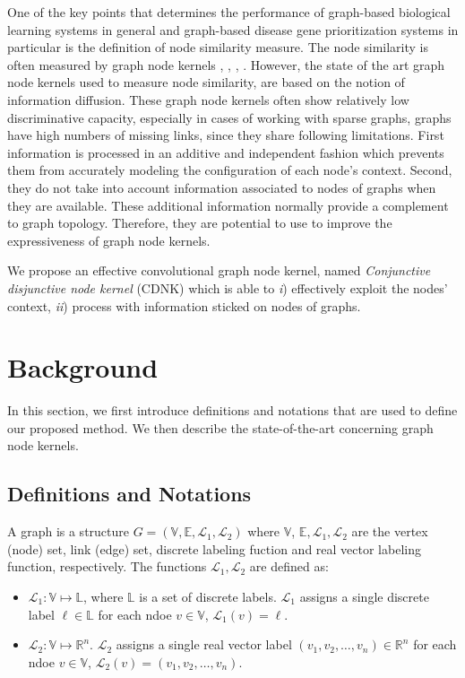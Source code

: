 \documentclass[review]{elsarticle}
\begin{document}
One of the key points that determines the performance of graph-based biological learning systems in general and graph-based disease gene prioritization systems in particular is the definition of node similarity measure. The node similarity is often measured by graph node kernels \cite{kondor2002diffusion}, \cite{chen2014disease}, \cite{fouss2006experimental}, \cite{chebotarev2006matrix}. However, the state of the art graph node kernels used to measure node similarity, are based on the notion of information diffusion. These graph node kernels often show relatively low discriminative capacity, especially in cases of working with sparse graphs, graphs have high numbers of missing links, since they share following limitations. First information is processed in an additive and independent fashion which prevents them from accurately modeling the configuration of each node's context. Second, they do not take into account information associated to nodes of graphs when they are available. These additional information normally provide a complement to graph topology. Therefore, they are potential to use to improve the expressiveness of graph node kernels. 

We propose an effective convolutional graph node kernel, named \textit{Conjunctive disjunctive node kernel} (CDNK) which is able to \textit{i}) effectively exploit the nodes' context, \textit{ii}) process with information sticked on nodes of graphs.

\section{Background}
In this section, we first introduce definitions and notations that are used to define our proposed method. We then describe the state-of-the-art concerning graph node kernels.
\subsection{Definitions and Notations}
A graph is a structure $G=(\mathbb{V},\mathbb{E}, \mathcal{L}_1, \mathcal{L}_2)$ where $\mathbb{V}$, $\mathbb{E}, \mathcal{L}_1, \mathcal{L}_2$ are the vertex (node) set, link (edge) set, discrete labeling fuction and real vector labeling function, respectively. The functions $\mathcal{L}_1, \mathcal{L}_2$ are defined as:
\begin{itemize}
\item $\mathcal{L}_1: \mathbb{V} \longmapsto \mathbb{L}$, where $\mathbb{L}$ is a set of discrete labels. $\mathcal{L}_1$ assigns a single discrete label $\ell \in \mathbb{L}$ for each ndoe $v \in \mathbb{V}$, $\mathcal{L}_1(v) = \ell$. 
\item $\mathcal{L}_2: \mathbb{V} \longmapsto \mathbb{R}^n$. $\mathcal{L}_2$ assigns a single real vector label $(v_1,v_2,\ldots,v_n) \in \mathbb{R}^n$ for each ndoe $v \in \mathbb{V}$, $\mathcal{L}_2(v) = (v_1,v_2,\ldots,v_n)$.
\end{itemize}
\end{document}
